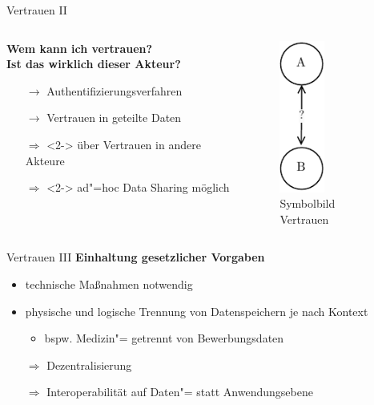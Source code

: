\begin{frame}{Vertrauen II}
    \begin{columns}
        \begin{column}{0.6\textwidth}
            \textbf{Wem kann ich vertrauen?\\Ist das wirklich dieser Akteur?}
            \begin{itemize}
                \item[$\to$] Authentifizierungsverfahren
                \item[$\to$] Vertrauen in geteilte Daten
                
        
                \item[$\Rightarrow$]<2-> über Vertrauen in andere Akteure
                \item[$\Rightarrow$]<2-> ad"=hoc Data Sharing möglich
            \end{itemize}
        \end{column}

        \begin{column}{0.4\textwidth}
            \begin{figure}
                \centering
                \includegraphics[height=5cm]{./assets/trust_question.drawio.pdf}
                \caption{Symbolbild Vertrauen}
            \end{figure}
        \end{column}
    \end{columns}
\end{frame}

\begin{frame}{Vertrauen III}
    \textbf{Einhaltung gesetzlicher Vorgaben}
    \begin{itemize}
        \item technische Maßnahmen notwendig

        \pause
        \item physische und logische Trennung von Datenspeichern je nach Kontext
        \begin{itemize}
            \item bspw. Medizin"= getrennt von Bewerbungsdaten
        \end{itemize}

        \pause
        \item[$\Rightarrow$] Dezentralisierung
        \item[$\Rightarrow$] Interoperabilität auf Daten"= statt Anwendungsebene
    \end{itemize}
\end{frame}


